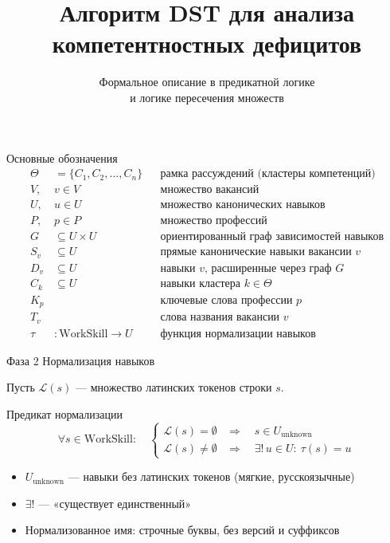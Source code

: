 \documentclass[12pt]{beamer}
\title{Алгоритм DST для анализа компетентностных дефицитов}
\subtitle{Формальное описание в предикатной логике\\и логике пересечения множеств}
\author{}
\date{}
\begin{document}
\begin{frame}
  \titlepage
\end{frame}

\begin{frame}{Основные обозначения}
  \begin{align*}
    \Theta &= \{C_1, C_2, \ldots, C_n\}
      && \text{рамка рассуждений (кластеры компетенций)} \\
    V,\ & v \in V
      && \text{множество вакансий} \\
    U,\ & u \in U
      && \text{множество канонических навыков} \\
    P,\ & p \in P
      && \text{множество профессий} \\
    G &\subseteq U \times U
      && \text{ориентированный граф зависимостей навыков} \\
    S_v &\subseteq U
      && \text{прямые канонические навыки вакансии } v \\
    D_v &\subseteq U
      && \text{навыки } v \text{, расширенные через граф } G \\
    C_k &\subseteq U
      && \text{навыки кластера } k \in \Theta \\
    K_p &
      && \text{ключевые слова профессии } p \\
    T_v &
      && \text{слова названия вакансии } v \\
    \tau &: \text{WorkSkill} \to U
      && \text{функция нормализации навыков}
  \end{align*}
\end{frame}

\begin{frame}{Фаза 2 \textendash{} Нормализация навыков}

  Пусть $\mathcal{L}(s)$ --- множество латинских токенов строки $s$.

  \begin{block}{Предикат нормализации}
    \[
      \forall s \in \text{WorkSkill}:\quad
      \begin{cases}
        \mathcal{L}(s) = \emptyset
          & \Rightarrow\quad s \in U_{\text{unknown}} \\[6pt]
        \mathcal{L}(s) \neq \emptyset
          & \Rightarrow\quad \exists!\, u \in U :\ \tau(s) = u
      \end{cases}
    \]
  \end{block}

  \bigskip
  \begin{itemize}
    \item $U_{\text{unknown}}$ --- навыки без латинских токенов
          (мягкие, русскоязычные)
    \item $\exists!$ --- «существует единственный»
    \item Нормализованное имя: строчные буквы, без версий и суффиксов
  \end{itemize}
\end{frame}
\end{document}
